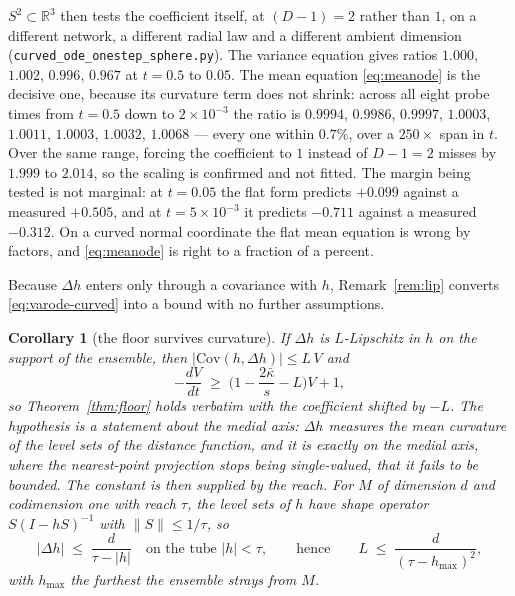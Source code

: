 \documentclass[11pt]{article}
\newtheorem{corollary}{Corollary}
\theoremstyle{remark}
\newcommand{\kb}{\bar\kappa}
\newcommand{\R}{\mathbb{R}}
\newcommand{\Cov}{\mathrm{Cov}}
\begin{document}
$S^2\subset\R^3$ then tests the coefficient itself, at $(D-1)=2$ rather than $1$, on a
different network, a different radial law and a different ambient dimension
(\texttt{curved\_ode\_onestep\_sphere.py}). The variance equation gives ratios $1.000$,
$1.002$, $0.996$, $0.967$ at $t=0.5$ to $0.05$. The mean equation \eqref{eq:meanode} is the
decisive one, because its curvature term does not shrink: across all eight probe times from
$t=0.5$ down to $2\times10^{-3}$ the ratio is $0.9994$, $0.9986$, $0.9997$, $1.0003$,
$1.0011$, $1.0003$, $1.0032$, $1.0068$ --- every one within $0.7\%$, over a $250\times$ span
in $t$. Over the same range, forcing the coefficient to $1$ instead of $D-1=2$ misses by
$1.999$ to $2.014$, so the scaling is confirmed and not fitted. The margin being tested is
not marginal: at $t=0.05$ the flat form predicts $+0.099$ against a measured $+0.505$, and at
$t=5\times10^{-3}$ it predicts $-0.711$ against a measured $-0.312$. On a curved normal
coordinate the flat mean equation is wrong by factors, and \eqref{eq:meanode} is right to a
fraction of a percent.

Because $\Delta h$ enters only through a covariance with $h$, Remark~\ref{rem:lip} converts
\eqref{eq:varode-curved} into a bound with no further assumptions.

\begin{corollary}[the floor survives curvature]\label{cor:curved}
If $\Delta h$ is $L$-Lipschitz in $h$ on the support of the ensemble, then
$|\Cov(h,\Delta h)|\le L\,V$ and
\[
-\frac{dV}{dt}\;\ge\;\Big(1-\frac{2\kb}{s}-L\Big)V+1 ,
\]
so Theorem~\ref{thm:floor} holds verbatim with the coefficient shifted by $-L$. The
hypothesis is a statement about the \emph{medial axis}: $\Delta h$ measures the mean
curvature of the level sets of the distance function, and it is exactly on the medial axis,
where the nearest-point projection stops being single-valued, that it fails to be bounded.
The constant is then supplied by the \emph{reach}. For $M$ of dimension $d$ and codimension
one with reach $\tau$, the level sets of $h$ have shape operator $S(I-hS)^{-1}$ with
$\|S\|\le1/\tau$, so
\begin{equation}
|\Delta h|\;\le\;\frac{d}{\tau-|h|}\quad\text{on the tube }|h|<\tau,
\qquad\text{hence}\qquad L\;\le\;\frac{d}{(\tau-h_{\max})^{2}},
\label{eq:reachbound}
\end{equation}
with $h_{\max}$ the furthest the ensemble strays from $M$.
\end{corollary}
\end{document}
